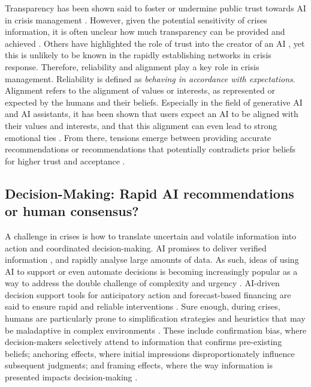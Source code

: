 \documentclass[pdflatex,sn-apa]{sn-jnl}%
\begin{document}
Transparency has been shown said to foster or undermine public trust towards AI in crisis management \citep{steinbrink2024impact, visave2025transparency}. However, given the potential sensitivity of crises information, it is often unclear how much transparency can be provided and achieved \citep{steinbrink2024impact}. Others have highlighted the role of trust into the creator of an AI \citep{saffarizadeh2024relationship}, yet this is unlikely to be known in the rapidly establishing networks in crisis response. Therefore, reliability and alignment play a key role in crisis management. Reliability is defined as \textit{behaving in accordance with expectations}. Alignment refers to the alignment of values or interests, as represented or expected by the humans and their beliefs. Especially in the field of generative AI and AI assistants, it has been shown that users expect an AI to be aligned with their values and interests, and that this alignment can even lead to strong emotional ties \citep{manzini2024should, kaplan2023trust}. From there, tensions emerge between providing accurate recommendations or recommendations that potentially contradicts prior beliefs for higher trust and acceptance \citep{sharma2024generative, ekstrom2022self}.

\subsection{Decision-Making: Rapid AI recommendations or human consensus?}
A challenge in crises is how to translate uncertain and volatile information into action and coordinated decision-making. AI promises to deliver verified information \citep{zhao2025tailoring}, and rapidly analyse large amounts of data. As such, ideas of using AI to support or even automate decisions is becoming increasingly popular as a way to address the double challenge of complexity and urgency \citep{comes2024ai}. AI-driven decision support tools for anticipatory action and forecast-based financing are said to ensure rapid and reliable interventions \citep{thalheimer2022role}. Sure enough, during crises, humans are particularly prone to simplification strategies and heuristics that may be maladaptive in complex environments \citep{klein2010rapid}. These include confirmation bias, where decision-makers selectively attend to information that confirms pre-existing beliefs; anchoring effects, where initial impressions disproportionately influence subsequent judgments; and framing effects, where the way information is presented impacts decision-making \citep{paulus2022influence}.
\end{document}
